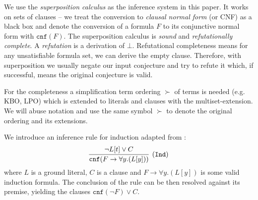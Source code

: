 We use the \textit{superposition calculus} as the inference system in this paper. It works on sets of clauses -- we treat the conversion to \textit{clausal normal form} (or CNF) as a black box \cite{vcnf} and denote the conversion of a formula $F$ to its conjunctive normal form with $\mathtt{cnf}(F)$. The superposition calculus is \textit{sound} and \textit{refutationally complete}. A \textit{refutation} is a derivation of $\bot$. Refutational completeness means for any unsatisfiable formula set, we can derive the empty clause. Therefore, with superposition we usually negate our input conjecture and try to refute it which, if successful, means the original conjecture is valid.

For the completeness a simplification term ordering $\succ$ of terms is needed (e.g. KBO, LPO) which is extended to literals and clauses with the multiset-extension. We will abuse notation and use the same symbol $\succ$ to denote the original ordering and its extensions.

We introduce an inference rule for induction adapted from \cite{vampireinduction}:
\begin{equation*}\label{eq:ind:rule}
\infer[\small{\tt (Ind)}]{\mathtt{cnf}(F \rightarrow \forall y.(L[y]))}{\lnot L[t] \lor C}
\end{equation*}
where $L$ is a ground literal, $C$ is a clause and $F \rightarrow \forall y.(L[y])$ is some valid induction formula. The conclusion of the rule can be then resolved against its
premise, yielding the clauses $\mathtt{cnf}(\lnot F) \lor C$.